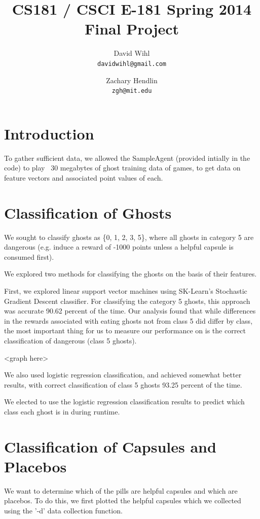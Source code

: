 \documentclass[11pt, oneside]{article}   	%
\title{CS181 / CSCI E-181 Spring 2014 Final Project}
\author{
  David Wihl\\
  \texttt{davidwihl@gmail.com}
  \and
  Zachary Hendlin\\
  \texttt{zgh@mit.edu} 
}
\begin{document}
\maketitle

\begingroup
\hypersetup{linkcolor=blue}
\tableofcontents
\endgroup

\section{Introduction}
To gather sufficient data, we allowed the SampleAgent (provided intially in the code) to play ~30 megabytes of ghost training data of games, to get data on feature vectors and associated point values of each.

\section{Classification of Ghosts}
We sought to classify ghosts as \{0, 1, 2, 3, 5\}, where all ghosts in category 5 are dangerous (e.g. induce a reward of -1000 points unless a helpful capsule is consumed first).

We explored two methods for classifying the ghosts on the basis of their features.

First, we explored linear support vector machines using SK-Learn's Stochastic Gradient Descent classifier.
For classifying the category 5 ghosts, this approach was accurate 90.62 percent of the time. Our analysis found that while differences in the rewards associated with eating ghosts not from class 5 did differ by class, the most important thing for us to measure our performance on is the correct classification of dangerous (class 5 ghosts).

<graph here>

We also used logistic regression classification, and achieved somewhat better results, with correct classification of class 5 ghosts 93.25 percent of the time.

We elected to use the logistic regression classification results to predict which class each ghost is in during runtime.

\section{Classification of Capsules and Placebos}
We want to determine which of the pills are helpful capsules and which are placebos. To do this, we first plotted the helpful capsules which we collected using the '-d' data collection function.
\end{document}
